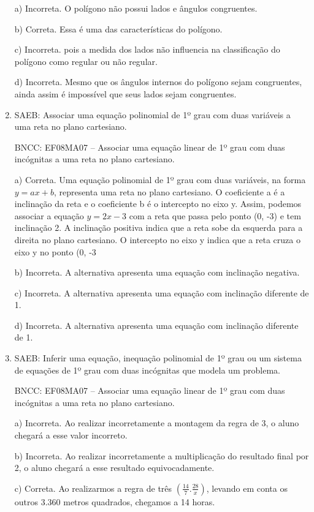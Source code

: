 \begin{enumerate}
a) Incorreta. O polígono não possui lados e ângulos congruentes.

b) Correta. Essa é uma das características do polígono.

c) Incorreta. pois a medida dos lados não influencia na classificação
do polígono como regular ou não regular.

d) Incorreta. Mesmo que os ângulos internos do polígono sejam
congruentes, ainda assim é impossível que seus lados sejam congruentes.

\item SAEB: Associar uma equação polinomial de 1º grau com duas variáveis a
uma reta no plano cartesiano.

BNCC: EF08MA07 -- Associar uma equação linear de 1º grau com duas
incógnitas a uma reta no plano cartesiano.

a) Correta. Uma equação polinomial de 1º grau com duas variáveis,
na forma $y = ax + b$, representa uma reta no plano cartesiano. O
coeficiente a é a inclinação da reta e o coeficiente b é o intercepto no
eixo y. Assim, podemos associar a equação $y = 2x - 3$ com a reta que
passa pelo ponto (0, -3) e tem inclinação 2. A inclinação positiva
indica que a reta sobe da esquerda para a direita no plano cartesiano. O
intercepto no eixo y indica que a reta cruza o eixo y no ponto (0, -3

b) Incorreta. A alternativa apresenta uma equação com inclinação
negativa.

c) Incorreta. A alternativa apresenta uma equação com inclinação
diferente de 1.

d) Incorreta. A alternativa apresenta uma equação com inclinação
diferente de 1.

\item SAEB: Inferir uma equação, inequação polinomial de 1º grau ou um sistema
de equações de 1º grau com duas incógnitas que modela um problema.

BNCC: EF08MA07 -- Associar uma equação linear de 1º grau com duas
incógnitas a uma reta no plano cartesiano.

a) Incorreta. Ao realizar incorretamente a montagem da
regra de 3, o aluno chegará a esse valor incorreto.

b) Incorreta. Ao realizar incorretamente a
multiplicação do resultado final por 2, o aluno chegará a esse resultado
equivocadamente.

c) Correta. Ao realizarmos a regra de três
$(\frac{14}{7} . \frac{28}{x})$, levando em conta os outros 3.360 metros quadrados,
chegamos a 14 horas.


\end{enumerate}
